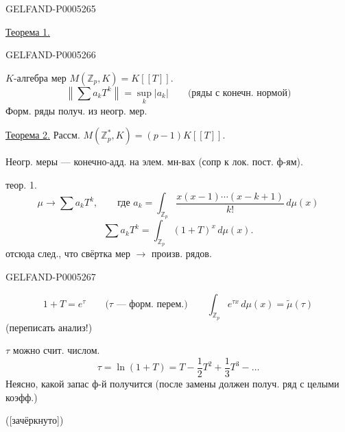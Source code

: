 \begin{GelfandAdjacentEvidence}{GELFAND-P000526}{5}


\uline{Теорема 1.}
\end{GelfandAdjacentEvidence}
\begin{GelfandAdjacentEvidence}{GELFAND-P000526}{6}

$K$-алгебра мер $M(\mathbb Z_p,K)=K[[T]]$.
\[
\left\|\sum a_kT^k\right\|=\sup_k|a_k|
\qquad\text{(ряды с конечн. нормой)}
\]
Форм. ряды получ. из неогр. мер.

\uline{Теорема 2.} Рассм. $M(\mathbb Z_p^*,K)=(p-1)K[[T]]$.

Неогр. меры — конечно-адд. на элем. мн-вах (сопр к лок. пост. ф-ям).

 теор. 1.
\[
\mu\longrightarrow\sum a_kT^k,\qquad
\text{где }a_k=\int_{\mathbb Z_p}\frac{x(x-1)\cdots(x-k+1)}{k!}\,d\mu(x)
\]
\[
\sum a_kT^k=\int_{\mathbb Z_p}(1+T)^x\,d\mu(x).
\]
отсюда след., что свёртка мер $\longrightarrow$ произв. рядов.

\end{GelfandAdjacentEvidence}
\begin{GelfandAdjacentEvidence}{GELFAND-P000526}{7}

\[
1+T=e^\tau\qquad\text{($\tau$ — форм. перем.)}
\qquad\int_{\mathbb Z_p}e^{\tau x}\,d\mu(x)=\widetilde{\mu}(\tau)
\]
(переписать анализ!)

$\tau$ можно счит. числом.
\[
\tau=\ln(1+T)=T-\frac12T^2+\frac13T^3-\ldots
\]
Неясно, какой запас ф-й получится (после замены должен получ. ряд с целыми коэфф.)

([зачёркнуто])
\end{GelfandAdjacentEvidence}
